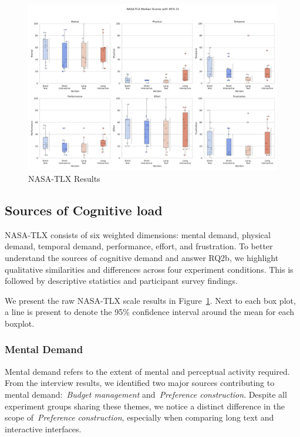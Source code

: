 \begin{figure}[ht]
    \centering
    \includegraphics[width=\textwidth]{content/image/results/nasatlx_final_value_with_CI.pdf}
    \caption{NASA-TLX Results}
    \label{fig:nasatlx-with-ci}
\end{figure}


\subsection{Sources of Cognitive load}
NASA-TLX consists of six weighted dimensions: mental demand, physical demand, temporal demand, performance, effort, and frustration. To better understand the sources of cognitive demand and answer RQ2b, we highlight qualitative similarities and differences across four experiment conditions. This is followed by descriptive statistics and participant survey findings.

We present the raw NASA-TLX scale results in Figure~\ref{fig:nasatlx-with-ci}. Next to each box plot, a line is present to denote the 95\% confidence interval around the mean for each boxplot.

\subsubsection{Mental Demand}
Mental demand refers to the extent of mental and perceptual activity required. From the interview results, we identified two major sources contributing to mental demand:~\textit{Budget management} and~\textit{Preference construction}. Despite all experiment groups sharing these themes, we notice a distinct difference in the scope of~\textit{Preference construction}, especially when comparing long text and interactive interfaces.


